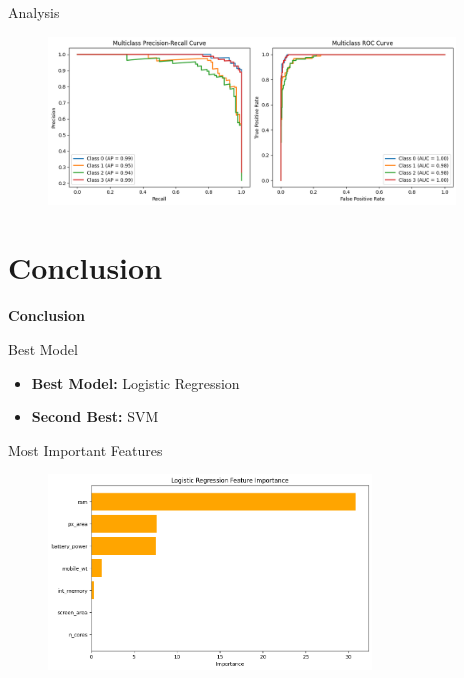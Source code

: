 \documentclass[14pt, aspectratio=169]{beamer}
\begin{document}
\begin{frame}[allowframebreaks]{Analysis}
\begin{adjustwidth}{-0.3cm}{0cm}
\begin{figure}[H]
  \centering
  \includegraphics[height=12em]{../report/ra_pr_XG.png}
  \label{ra_pr_XG}
\end{figure}
\end{adjustwidth}

\end{frame}

\section{Conclusion}
\begin{frame}{}
  \Huge
  \centering
  \textbf{Conclusion}
  \normalsize
\end{frame}
\begin{frame}{Best Model}
  \begin{itemize}
    \setlength\itemsep{1em}
    \item \textbf{Best Model:} Logistic Regression
    \item \textbf{Second Best:} SVM
  \end{itemize}
\end{frame}

\begin{frame}{Most Important Features}
  
  \begin{figure}[H]
    \centering
    \includegraphics[height=14em]{feature_importance.png}
    \label{most_imp_feature}
  \end{figure}
\end{frame}
  
\end{document}
